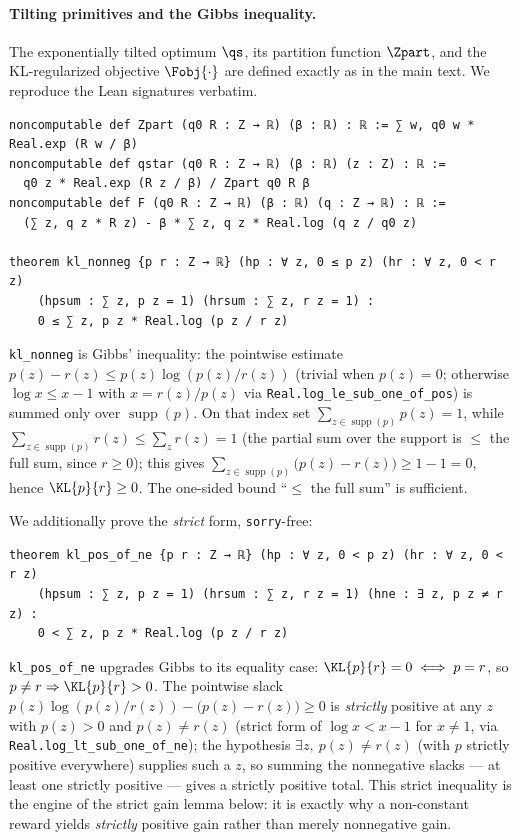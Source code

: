 \paragraph{Tilting primitives and the Gibbs inequality.}
The exponentially tilted optimum $\qs$, its partition function $\Zpart$, and the KL-regularized
objective $\Fobj{\cdot}$ are defined exactly as in the main text. We reproduce the Lean signatures
verbatim.

\begin{verbatim}
noncomputable def Zpart (q0 R : Z → ℝ) (β : ℝ) : ℝ := ∑ w, q0 w * Real.exp (R w / β)
noncomputable def qstar (q0 R : Z → ℝ) (β : ℝ) (z : Z) : ℝ :=
  q0 z * Real.exp (R z / β) / Zpart q0 R β
noncomputable def F (q0 R : Z → ℝ) (β : ℝ) (q : Z → ℝ) : ℝ :=
  (∑ z, q z * R z) - β * ∑ z, q z * Real.log (q z / q0 z)

theorem kl_nonneg {p r : Z → ℝ} (hp : ∀ z, 0 ≤ p z) (hr : ∀ z, 0 < r z)
    (hpsum : ∑ z, p z = 1) (hrsum : ∑ z, r z = 1) :
    0 ≤ ∑ z, p z * Real.log (p z / r z)
\end{verbatim}

\noindent
\texttt{kl\_nonneg} is Gibbs' inequality: the pointwise estimate $p(z)-r(z)\le p(z)\log(p(z)/r(z))$
(trivial when $p(z)=0$; otherwise $\log x \le x-1$ with $x=r(z)/p(z)$ via
\texttt{Real.log\_le\_sub\_one\_of\_pos}) is summed only over $\operatorname{supp}(p)$. On that index
set $\sum_{z\in\operatorname{supp}(p)} p(z)=1$, while $\sum_{z\in\operatorname{supp}(p)} r(z)\le
\sum_z r(z)=1$ (the partial sum over the support is $\le$ the full sum, since $r\ge 0$); this gives
$\sum_{z\in\operatorname{supp}(p)}\big(p(z)-r(z)\big)\ge 1-1=0$, hence $\KL{p}{r}\ge 0$. The one-sided
bound ``$\le$ the full sum'' is sufficient.

We additionally prove the \emph{strict} form, \texttt{sorry}-free:

\begin{verbatim}
theorem kl_pos_of_ne {p r : Z → ℝ} (hp : ∀ z, 0 < p z) (hr : ∀ z, 0 < r z)
    (hpsum : ∑ z, p z = 1) (hrsum : ∑ z, r z = 1) (hne : ∃ z, p z ≠ r z) :
    0 < ∑ z, p z * Real.log (p z / r z)
\end{verbatim}

\noindent
\texttt{kl\_pos\_of\_ne} upgrades Gibbs to its equality case: $\KL{p}{r}=0\iff p=r$, so
$p\ne r\Rightarrow\KL{p}{r}>0$. The pointwise slack $p(z)\log(p(z)/r(z))-\big(p(z)-r(z)\big)\ge 0$ is
\emph{strictly} positive at any $z$ with $p(z)>0$ and $p(z)\ne r(z)$ (strict form of $\log x<x-1$ for
$x\ne 1$, via \texttt{Real.log\_lt\_sub\_one\_of\_ne}); the hypothesis $\exists z,\ p(z)\ne r(z)$
(with $p$ strictly positive everywhere) supplies such a $z$, so summing the nonnegative slacks --- at
least one strictly positive --- gives a strictly positive total. This strict inequality is the engine
of the strict gain lemma below: it is exactly why a non-constant reward yields \emph{strictly}
positive gain rather than merely nonnegative gain.

